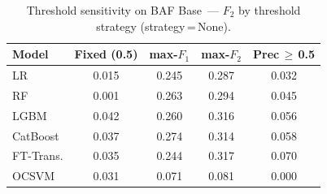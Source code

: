 \begin{table}[ht!]
\centering
\caption{Threshold sensitivity on BAF Base~--- $F_2$ by threshold strategy (strategy\,=\,None).}
\label{tab:threshold_baf_f2}
\begin{tabular}{l c c c c}
\toprule
Model & Fixed (0.5) & max-$F_1$ & max-$F_2$ & Prec\,$\geq$\,0.5 \\
\midrule
LR         & 0.015 & 0.245 & 0.287 & 0.032 \\
RF         & 0.001 & 0.263 & 0.294 & 0.045 \\
LGBM       & 0.042 & 0.260 & 0.316 & 0.056 \\
CatBoost   & 0.037 & 0.274 & 0.314 & 0.058 \\
FT-Trans.  & 0.035 & 0.244 & 0.317 & 0.070 \\
OCSVM      & 0.031 & 0.071 & 0.081 & 0.000 \\
\bottomrule
\end{tabular}
\end{table}